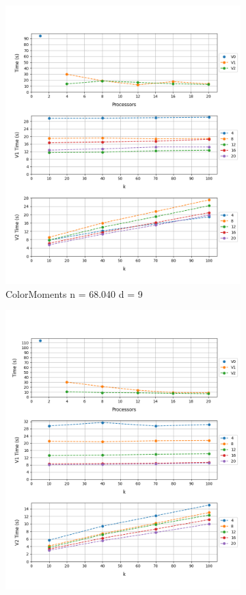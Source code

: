 \documentclass[12pt, a4paper]{article}
\begin{document}
\begin{figure}[h!]
\begin{subfigure}[b]{0.33\textwidth}
         \includegraphics[height=.20\textheight, width=\textwidth, keepaspectratio]{assets/corel/moments.png}
         \caption{ColorMoments n = 68.040 d = 9}
     \end{subfigure}
     \begin{subfigure}[b]{0.33\textwidth}
         \centering
         \includegraphics[height=.20\textheight, width=\textwidth, keepaspectratio]{assets/corel/texture.png}

\end{subfigure}
\end{figure}
\end{document}
